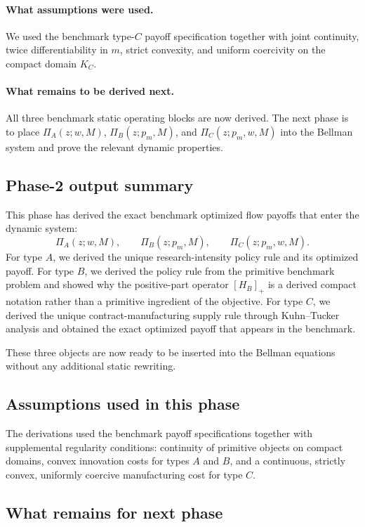 \paragraph{What assumptions were used.}
We used the benchmark type-$C$ payoff specification together with joint continuity, twice differentiability in $m$, strict convexity, and uniform coercivity on the compact domain $K_C$.

\paragraph{What remains to be derived next.}
All three benchmark static operating blocks are now derived. The next phase is to place $\Pi_A(z;w,M)$, $\Pi_B(z;p_m,M)$, and $\Pi_C(z;p_m,w,M)$ into the Bellman system and prove the relevant dynamic properties.

\subsection{Phase-2 output summary}

This phase has derived the exact benchmark optimized flow payoffs that enter the dynamic system:
\[
\Pi_A(z;w,M),\qquad \Pi_B(z;p_m,M),\qquad \Pi_C(z;p_m,w,M).
\]
For type $A$, we derived the unique research-intensity policy rule and its optimized payoff. For type $B$, we derived the policy rule from the primitive benchmark problem and showed why the positive-part operator $[H_B]_+$ is a derived compact notation rather than a primitive ingredient of the objective. For type $C$, we derived the unique contract-manufacturing supply rule through Kuhn--Tucker analysis and obtained the exact optimized payoff that appears in the benchmark.

These three objects are now ready to be inserted into the Bellman equations without any additional static rewriting.

\subsection{Assumptions used in this phase}

The derivations used the benchmark payoff specifications together with supplemental regularity conditions: continuity of primitive objects on compact domains, convex innovation costs for types $A$ and $B$, and a continuous, strictly convex, uniformly coercive manufacturing cost for type $C$.

\subsection{What remains for next phase}

